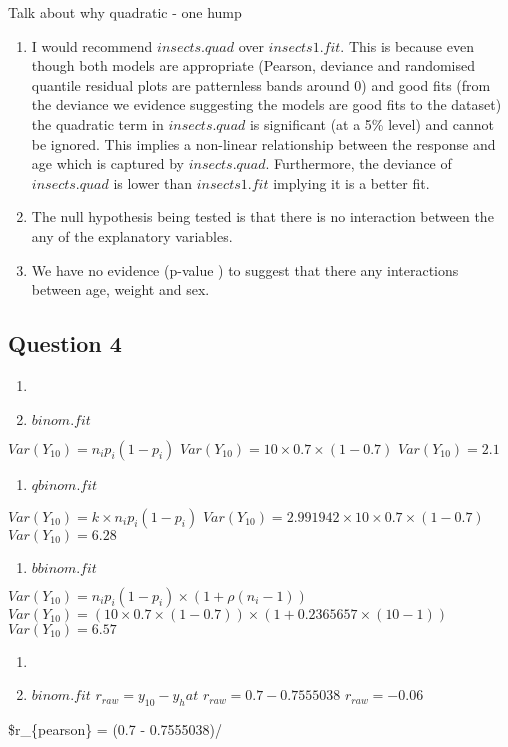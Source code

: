 \documentclass[
]{article}
\providecommand{\tightlist}{%
  \setlength{\itemsep}{0pt}\setlength{\parskip}{0pt}}
\begin{document}
Talk about why quadratic - one hump

\begin{enumerate}
\def\labelenumi{\alph{enumi})}
\setcounter{enumi}{3}
\item
  I would recommend \(insects.quad\) over \(insects1.fit\). This is
  because even though both models are appropriate (Pearson, deviance and
  randomised quantile residual plots are patternless bands around 0) and
  good fits (from the deviance we evidence suggesting the models are
  good fits to the dataset) the quadratic term in \(insects.quad\) is
  significant (at a 5\% level) and cannot be ignored. This implies a
  non-linear relationship between the response and age which is captured
  by \(insects.quad\). Furthermore, the deviance of \(insects.quad\) is
  lower than \(insects1.fit\) implying it is a better fit.
\item
  The null hypothesis being tested is that there is no interaction
  between the any of the explanatory variables.
\item
  We have no evidence (p-value ) to suggest that there any
  interactions between age, weight and sex.
\end{enumerate}

\hypertarget{question-4}{%
\subsection{Question 4}\label{question-4}}

\begin{enumerate}
\def\labelenumi{\alph{enumi})}
\item
\item
  \(binom.fit\)
\end{enumerate}

\(Var(Y_{10}) = n_ip_i(1-p_i)\)
\(Var(Y_{10}) = 10 \times 0.7 \times (1-0.7)\) \(Var(Y_{10}) = 2.1\)

\begin{enumerate}
\def\labelenumi{\roman{enumi})}
\setcounter{enumi}{1}
\tightlist
\item
  \(qbinom.fit\)
\end{enumerate}

\(Var(Y_{10}) = k \times n_ip_i(1-p_i)\)
\(Var(Y_{10}) = 2.991942 \times 10 \times 0.7 \times (1-0.7)\)
\(Var(Y_{10}) = 6.28\)

\begin{enumerate}
\def\labelenumi{\roman{enumi})}
\setcounter{enumi}{2}
\tightlist
\item
  \(bbinom.fit\)
\end{enumerate}

\(Var(Y_{10}) = n_ip_i(1-p_i) \times (1+\rho(n_i-1))\)
\(Var(Y_{10}) = (10 \times 0.7 \times (1-0.7)) \times (1+0.2365657 \times (10-1))\)
\(Var(Y_{10}) = 6.57\)

\begin{enumerate}
\def\labelenumi{\alph{enumi})}
\setcounter{enumi}{1}
\item
\item
  \(binom.fit\) \(r_{raw} = y_{10} - y_hat\)
  \(r_{raw} = 0.7 - 0.7555038\) \(r_{raw} = -0.06\)
\end{enumerate}

\$r\_\{pearson\} = (0.7 - 0.7555038)/\sqrt
\end{document}
